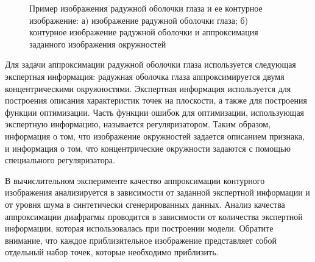 \begin{figure}[h!]
\caption{Пример изображения радужной оболочки глаза и ее контурное изображение: а) изображение радужной оболочки глаза; б) контурное изображение радужной оболочки и аппроксимация заданного изображения окружностей}
\label{intro:fig1}
\end{figure}

Для задачи аппроксимации радужной оболочки глаза используется следующая экспертная информация: радужная оболочка глаза аппроксимируется двумя концентрическими окружностями. Экспертная информация используется для построения описания характеристик точек на плоскости, а также для построения функции оптимизации. Часть функции ошибок для оптимизации, использующая экспертную информацию, называется регуляризатором. Таким образом, информация о том, что изображение окружностей задается описанием признака, и информация о том, что концентрические окружности задаются с помощью специального регуляризатора.

В вычислительном эксперименте качество аппроксимации контурного изображения анализируется в зависимости от заданной экспертной информации и от уровня шума в синтетически сгенерированных данных. Анализ качества аппроксимации диафрагмы проводится в зависимости от количества экспертной информации, которая использовалась при построении модели. Обратите внимание, что каждое приблизительное изображение представляет собой отдельный набор точек, которые необходимо приблизить.

